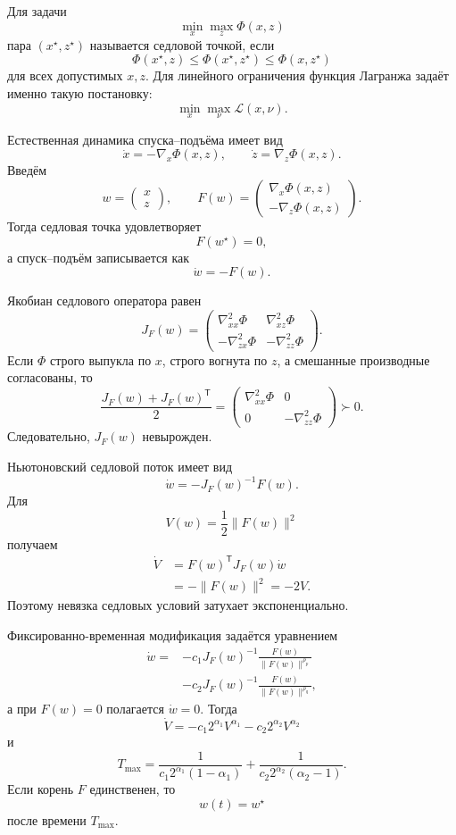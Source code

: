 Для задачи
\[
    \min_x\max_z\Phi(x,z)
\]
пара \((x^\star,z^\star)\) называется седловой точкой, если
\[
    \Phi(x^\star,z)
    \le
    \Phi(x^\star,z^\star)
    \le
    \Phi(x,z^\star)
\]
для всех допустимых \(x,z\). Для линейного ограничения функция
Лагранжа задаёт именно такую постановку:
\[
    \min_x\max_\nu\mathcal L(x,\nu).
\]

Естественная динамика спуска--подъёма имеет вид
\[
    \dot x=-\nabla_x\Phi(x,z),
    \qquad
    \dot z=\nabla_z\Phi(x,z).
\]
Введём
\[
    w=
    \begin{pmatrix}
        x\\
        z
    \end{pmatrix},
    \qquad
    F(w)=
    \begin{pmatrix}
        \nabla_x\Phi(x,z)\\
        -\nabla_z\Phi(x,z)
    \end{pmatrix}.
\]
Тогда седловая точка удовлетворяет
\[
    F(w^\star)=0,
\]
а спуск--подъём записывается как
\[
    \dot w=-F(w).
\]

Якобиан седлового оператора равен
\[
    J_F(w)
    =
    \begin{pmatrix}
        \nabla^2_{xx}\Phi
        &
        \nabla^2_{xz}\Phi
        \\
        -\nabla^2_{zx}\Phi
        &
        -\nabla^2_{zz}\Phi
    \end{pmatrix}.
\]
Если \(\Phi\) строго выпукла по \(x\), строго вогнута по \(z\), а
смешанные производные согласованы, то
\[
    \frac{
        J_F(w)+J_F(w)^{\mathsf T}
    }2
    =
    \begin{pmatrix}
        \nabla^2_{xx}\Phi&0\\
        0&-\nabla^2_{zz}\Phi
    \end{pmatrix}
    \succ0.
\]
Следовательно, \(J_F(w)\) невырожден.

Ньютоновский седловой поток имеет вид
\[
    \dot w=-J_F(w)^{-1}F(w).
\]
Для
\[
    V(w)=\frac12\lVert F(w)\rVert^2
\]
получаем
\[
\begin{aligned}
    \dot V
    &=
    F(w)^{\mathsf T}J_F(w)\dot w
    \\
    &=
    -\lVert F(w)\rVert^2
    =
    -2V.
\end{aligned}
\]
Поэтому невязка седловых условий затухает экспоненциально.

Фиксированно-временная модификация задаётся уравнением
\[
\begin{aligned}
    \dot w
    ={}&
    -c_1J_F(w)^{-1}
    \frac{F(w)}
    {\lVert F(w)\rVert^{\rho_p}}
    \\
    &-
    c_2J_F(w)^{-1}
    \frac{F(w)}
    {\lVert F(w)\rVert^{\rho_q}},
\end{aligned}
\]
а при \(F(w)=0\) полагается \(\dot w=0\). Тогда
\[
    \dot V
    =
    -c_1 2^{\alpha_1}V^{\alpha_1}
    -
    c_2 2^{\alpha_2}V^{\alpha_2}
\]
и
\[
    T_{\max}
    =
    \frac1{
        c_1 2^{\alpha_1}(1-\alpha_1)
    }
    +
    \frac1{
        c_2 2^{\alpha_2}(\alpha_2-1)
    }.
\]
Если корень \(F\) единственен, то
\[
    w(t)=w^\star
\]
после времени \(T_{\max}\).

